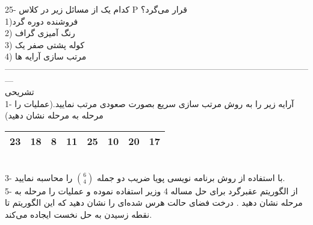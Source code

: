 \documentclass{book}
\begin{document}
25- کدام یک از مسائل زیر در کلاس P قرار می‌گرد؟\\
1)فروشنده دوره گرد\\
2) رنگ آمیزی گراف\\
3) کوله پشتی صفر یک\\
4) مرتب سازی آرایه ها\\


---------------------------------------------------------------------------------------------------------------\\
تشریحی\\

1- آرایه زیر را به روش مرتب سازی سریع بصورت صعودی مرتب نمایید.(عملیات را مرحله به مرحله نشان دهید)\\


\begin{table}[htp]
\renewcommand{\arraystretch}{1.5}
\begin{tabular}{|c|c|c|c|c|c|c|c|}
\hline
 23&18 & 8 &11 &25 &10 & 20 & 17\\ 
\hline
\end{tabular}
\end{table}\\

3- با استفاده از روش برنامه نویسی پویا ضریب دو جمله  $\binom{6}{4} $ را محاسبه نمایید.\\


5- از الگوریتم عقبرگرد برای حل مساله 4 وزیر استفاده نموده و عملیات را مرحله به مرحله نشان دهید . درخت فضای حالت هرس شده‌ای را نشان دهید که این الگوریتم تا نقطه زسیدن به حل نخست ایجاده می‌کند.\\
\end{document}
